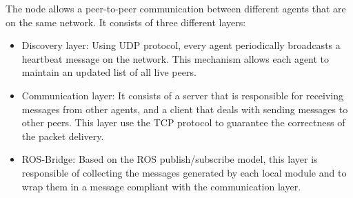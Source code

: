 	The node allows a peer-to-peer communication between different agents that are on the same network. It consists of three different layers:
	\begin{itemize}
		\item Discovery layer:
			Using UDP protocol, every agent periodically broadcasts a heartbeat message on the network. This mechanism allows each agent to maintain an updated list of all live peers.
		\item Communication layer:
			It consists of a server that is responsible for receiving messages from other agents, and a client that deals with sending messages to other peers. This layer use the TCP protocol to guarantee the correctness of the packet delivery.
		\item ROS-Bridge:
			Based on the ROS publish/subscribe model, this layer is responsible of collecting the messages generated by each local module and to wrap them in a message compliant with the communication layer.

			
	\end{itemize}
	
	









